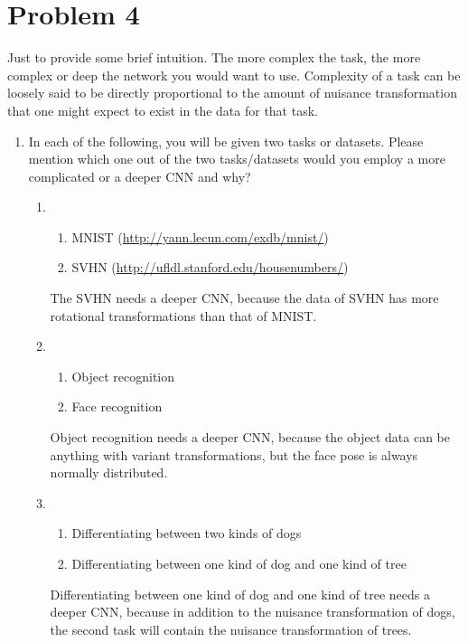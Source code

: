 \documentclass[letterpaper,11pt]{article}
\begin{document}
\section*{Problem 4}

Just to provide some brief intuition. The more complex the task, the more complex or deep the network you would want to use. Complexity of a task can be loosely said to be directly proportional to the amount of nuisance transformation that one might expect to exist in the data for that task.

\begin{enumerate}
	\item In each of the following, you will be given two tasks or datasets. Please mention which one out of the two tasks/datasets would you employ a more complicated or a deeper CNN and why?
	\begin{enumerate}
		\item 
		\begin{enumerate}
			\item MNIST (\url{http://yann.lecun.com/exdb/mnist/})
			\item SVHN (\url{http://ufldl.stanford.edu/housenumbers/})
		\end{enumerate}
		The SVHN needs a deeper CNN, because the data of SVHN has more rotational transformations than that of MNIST.
		\item 
		\begin{enumerate}
			\item Object recognition
			\item Face recognition
		\end{enumerate}
		Object recognition needs a deeper CNN, because the object data can be anything with variant transformations, but the face pose is always normally distributed.
		\item 
		\begin{enumerate}
			\item Differentiating between two kinds of dogs
			\item Differentiating between one kind of dog and one kind of tree
		\end{enumerate}
		Differentiating between one kind of dog and one kind of tree needs a deeper CNN, because in addition to the nuisance transformation of dogs, the second task will contain the nuisance transformation of trees.
		

\end{enumerate}
\end{enumerate}
\end{document}
